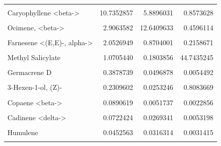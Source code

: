 \documentclass[12pt,final,CPage]{ufthesis}
\begin{document}
{\begin{longtable}[t]{lrrr}
  \endfoot
  \bottomrule
  \endlastfoot
  \cellcolor{gray!6}{Murrolene <gamma->} & \cellcolor{gray!6}{72.0312150} & \cellcolor{gray!6}{14.8458386} & \cellcolor{gray!6}{2.2559910}\\
  Caryophyllene <beta-> & 10.7352857 & 5.8896031 & 0.8573628\\
  \cellcolor{gray!6}{3-Hexen-1-ol Acetate (Z)-} & \cellcolor{gray!6}{5.4873502} & \cellcolor{gray!6}{2.4907075} & \cellcolor{gray!6}{15.1134127}\\
  Ocimene, <beta-> & 2.9063582 & 12.6409633 & 0.4596114\\
  \cellcolor{gray!6}{Pinene <alpha->} & \cellcolor{gray!6}{2.2118248} & \cellcolor{gray!6}{10.8381397} & \cellcolor{gray!6}{0.3605728}\\
  \addlinespace
  Farnesene <(E,E)-, alpha-> & 2.0526949 & 0.8704001 & 0.2158671\\
  \cellcolor{gray!6}{Pinene <beta->} & \cellcolor{gray!6}{1.3622616} & \cellcolor{gray!6}{3.8858693} & \cellcolor{gray!6}{0.3120422}\\
  Methyl Salicylate & 1.0705440 & 0.1803856 & 44.7435245\\
  \cellcolor{gray!6}{D-Limonene} & \cellcolor{gray!6}{0.4783855} & \cellcolor{gray!6}{42.7586741} & \cellcolor{gray!6}{6.7797188}\\
  Germacrene D & 0.3878739 & 0.0496878 & 0.0054492\\
  \addlinespace
  \cellcolor{gray!6}{Nona-1,3,7-triene <4-8-dimethyl-, (E)->} & \cellcolor{gray!6}{0.2421617} & \cellcolor{gray!6}{0.0465500} & \cellcolor{gray!6}{0.1880732}\\
  3-Hexen-1-ol, (Z)- & 0.2309602 & 0.0253246 & 0.8083669\\
  \cellcolor{gray!6}{Benzaldehyde} & \cellcolor{gray!6}{0.2290871} & \cellcolor{gray!6}{2.8464099} & \cellcolor{gray!6}{21.0212998}\\
  Copaene <beta-> & 0.0890619 & 0.0051737 & 0.0022856\\
  \cellcolor{gray!6}{Xylene <m->} & \cellcolor{gray!6}{0.0773006} & \cellcolor{gray!6}{0.4316211} & \cellcolor{gray!6}{5.6984868}\\
  \addlinespace
  Cadinene <delta-> & 0.0722424 & 0.0269341 & 0.0053198\\
  \cellcolor{gray!6}{Calamenene} & \cellcolor{gray!6}{0.0527682} & \cellcolor{gray!6}{0.5593544} & \cellcolor{gray!6}{0.1657161}\\
  Humulene & 0.0452563 & 0.0316314 & 0.0031415\\
  \cellcolor{gray!6}{Aromadendrene} & \cellcolor{gray!6}{0.0383456} & \cellcolor{gray!6}{0.0126573} & \cellcolor{gray!6}{0.0399404}\\

\end{longtable}}
\end{document}
